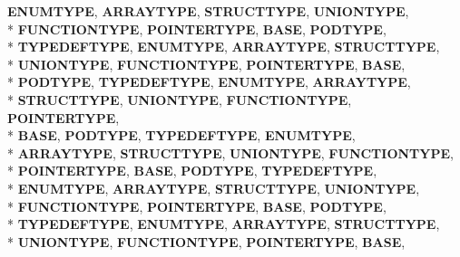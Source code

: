 \begin{DoxyCompactItemize}
{\bfseries E\-N\-U\-M\-T\-Y\-P\-E}, 
{\bfseries A\-R\-R\-A\-Y\-T\-Y\-P\-E}, 
{\bfseries S\-T\-R\-U\-C\-T\-T\-Y\-P\-E}, 
{\bfseries U\-N\-I\-O\-N\-T\-Y\-P\-E}, 
\\*
{\bfseries F\-U\-N\-C\-T\-I\-O\-N\-T\-Y\-P\-E}, 
{\bfseries P\-O\-I\-N\-T\-E\-R\-T\-Y\-P\-E}, 
{\bfseries B\-A\-S\-E}, 
{\bfseries P\-O\-D\-T\-Y\-P\-E}, 
\\*
{\bfseries T\-Y\-P\-E\-D\-E\-F\-T\-Y\-P\-E}, 
{\bfseries E\-N\-U\-M\-T\-Y\-P\-E}, 
{\bfseries A\-R\-R\-A\-Y\-T\-Y\-P\-E}, 
{\bfseries S\-T\-R\-U\-C\-T\-T\-Y\-P\-E}, 
\\*
{\bfseries U\-N\-I\-O\-N\-T\-Y\-P\-E}, 
{\bfseries F\-U\-N\-C\-T\-I\-O\-N\-T\-Y\-P\-E}, 
{\bfseries P\-O\-I\-N\-T\-E\-R\-T\-Y\-P\-E}, 
{\bfseries B\-A\-S\-E}, 
\\*
{\bfseries P\-O\-D\-T\-Y\-P\-E}, 
{\bfseries T\-Y\-P\-E\-D\-E\-F\-T\-Y\-P\-E}, 
{\bfseries E\-N\-U\-M\-T\-Y\-P\-E}, 
{\bfseries A\-R\-R\-A\-Y\-T\-Y\-P\-E}, 
\\*
{\bfseries S\-T\-R\-U\-C\-T\-T\-Y\-P\-E}, 
{\bfseries U\-N\-I\-O\-N\-T\-Y\-P\-E}, 
{\bfseries F\-U\-N\-C\-T\-I\-O\-N\-T\-Y\-P\-E}, 
{\bfseries P\-O\-I\-N\-T\-E\-R\-T\-Y\-P\-E}, 
\\*
{\bfseries B\-A\-S\-E}, 
{\bfseries P\-O\-D\-T\-Y\-P\-E}, 
{\bfseries T\-Y\-P\-E\-D\-E\-F\-T\-Y\-P\-E}, 
{\bfseries E\-N\-U\-M\-T\-Y\-P\-E}, 
\\*
{\bfseries A\-R\-R\-A\-Y\-T\-Y\-P\-E}, 
{\bfseries S\-T\-R\-U\-C\-T\-T\-Y\-P\-E}, 
{\bfseries U\-N\-I\-O\-N\-T\-Y\-P\-E}, 
{\bfseries F\-U\-N\-C\-T\-I\-O\-N\-T\-Y\-P\-E}, 
\\*
{\bfseries P\-O\-I\-N\-T\-E\-R\-T\-Y\-P\-E}, 
{\bfseries B\-A\-S\-E}, 
{\bfseries P\-O\-D\-T\-Y\-P\-E}, 
{\bfseries T\-Y\-P\-E\-D\-E\-F\-T\-Y\-P\-E}, 
\\*
{\bfseries E\-N\-U\-M\-T\-Y\-P\-E}, 
{\bfseries A\-R\-R\-A\-Y\-T\-Y\-P\-E}, 
{\bfseries S\-T\-R\-U\-C\-T\-T\-Y\-P\-E}, 
{\bfseries U\-N\-I\-O\-N\-T\-Y\-P\-E}, 
\\*
{\bfseries F\-U\-N\-C\-T\-I\-O\-N\-T\-Y\-P\-E}, 
{\bfseries P\-O\-I\-N\-T\-E\-R\-T\-Y\-P\-E}, 
{\bfseries B\-A\-S\-E}, 
{\bfseries P\-O\-D\-T\-Y\-P\-E}, 
\\*
{\bfseries T\-Y\-P\-E\-D\-E\-F\-T\-Y\-P\-E}, 
{\bfseries E\-N\-U\-M\-T\-Y\-P\-E}, 
{\bfseries A\-R\-R\-A\-Y\-T\-Y\-P\-E}, 
{\bfseries S\-T\-R\-U\-C\-T\-T\-Y\-P\-E}, 
\\*
{\bfseries U\-N\-I\-O\-N\-T\-Y\-P\-E}, 
{\bfseries F\-U\-N\-C\-T\-I\-O\-N\-T\-Y\-P\-E}, 
{\bfseries P\-O\-I\-N\-T\-E\-R\-T\-Y\-P\-E}, 
{\bfseries B\-A\-S\-E}, 

\end{DoxyCompactItemize}
